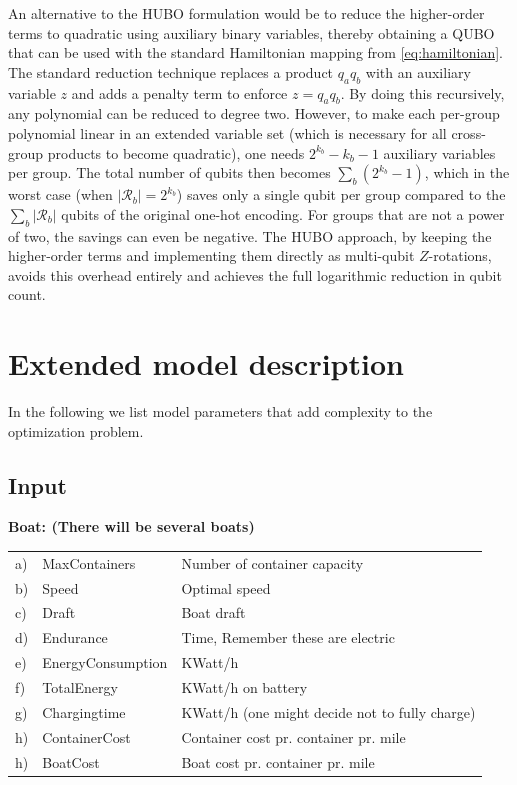 \documentclass{article}
\begin{document}
An alternative to the HUBO formulation would be to reduce the higher-order terms to quadratic using auxiliary binary variables, thereby obtaining a QUBO that can be used with the standard Hamiltonian mapping from \eqref{eq:hamiltonian}.
The standard reduction technique replaces a product $q_a q_b$ with an auxiliary variable $z$ and adds a penalty term to enforce $z = q_a q_b$. By doing this recursively, any polynomial can be reduced to degree two.
However, to make each per-group polynomial linear in an extended variable set (which is necessary for all cross-group products to become quadratic), one needs $2^{k_b} - k_b - 1$ auxiliary variables per group. The total number of qubits then becomes $\sum_b (2^{k_b} - 1)$, which in the worst case (when $|\mathcal{R}_b| = 2^{k_b}$) saves only a single qubit per group compared to the $\sum_b |\mathcal{R}_b|$ qubits of the original one-hot encoding.
For groups that are not a power of two, the savings can even be negative. The HUBO approach, by keeping the higher-order terms and implementing them directly as multi-qubit $Z$-rotations, avoids this overhead entirely and achieves the full logarithmic reduction in qubit count.





\printbibliography


\appendix
\section{Extended model description}
\label{app:extended-model}

In the following we list model parameters that add complexity to the optimization problem. 

\subsection{Input}
\textbf{Boat: (There will be several boats)}

\begin{tabularx}{0.95\textwidth}{lll}
 a) & MaxContainers& Number of container capacity \\
 b) & Speed& Optimal speed \\
 c) & Draft& Boat draft \\
 d) & Endurance& Time, Remember these are electric \\
 e) & EnergyConsumption& KWatt/h \\
 f) & TotalEnergy& KWatt/h on battery\\
 g) & Chargingtime& KWatt/h (one might decide not to fully charge)\\
 h) & ContainerCost& Container cost pr. container pr. mile\\
 h) & BoatCost& Boat cost pr. container pr. mile\\
\end{tabularx}        
\vspace{1em}
\end{document}
